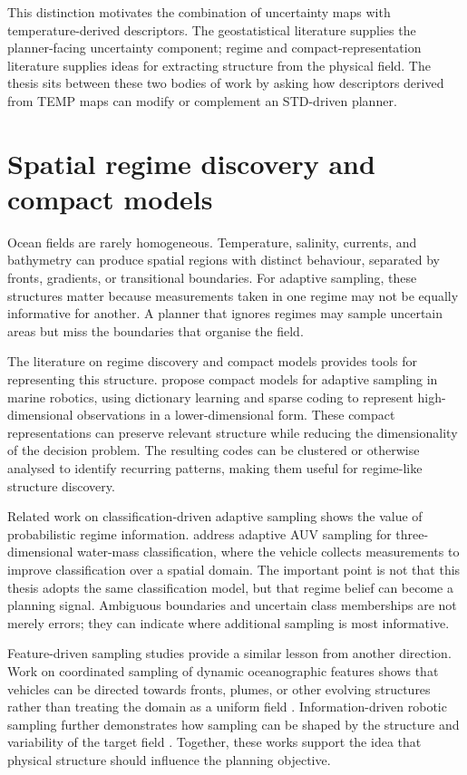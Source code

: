 This distinction motivates the combination of uncertainty maps with temperature-derived descriptors. The geostatistical literature supplies the planner-facing uncertainty component; regime and compact-representation literature supplies ideas for extracting structure from the physical field. The thesis sits between these two bodies of work by asking how descriptors derived from TEMP maps can modify or complement an STD-driven planner.

\section{Spatial regime discovery and compact models}
\label{sec:sota_regime_discovery}

Ocean fields are rarely homogeneous. Temperature, salinity, currents, and bathymetry can produce spatial regions with distinct behaviour, separated by fronts, gradients, or transitional boundaries. For adaptive sampling, these structures matter because measurements taken in one regime may not be equally informative for another. A planner that ignores regimes may sample uncertain areas but miss the boundaries that organise the field.

The literature on regime discovery and compact models provides tools for representing this structure. \textcite{fossum2020compact} propose compact models for adaptive sampling in marine robotics, using dictionary learning and sparse coding to represent high-dimensional observations in a lower-dimensional form. These compact representations can preserve relevant structure while reducing the dimensionality of the decision problem. The resulting codes can be clustered or otherwise analysed to identify recurring patterns, making them useful for regime-like structure discovery.

Related work on classification-driven adaptive sampling shows the value of probabilistic regime information. \textcite{ge2023watermasses} address adaptive AUV sampling for three-dimensional water-mass classification, where the vehicle collects measurements to improve classification over a spatial domain. The important point is not that this thesis adopts the same classification model, but that regime belief can become a planning signal. Ambiguous boundaries and uncertain class memberships are not merely errors; they can indicate where additional sampling is most informative.

Feature-driven sampling studies provide a similar lesson from another direction. Work on coordinated sampling of dynamic oceanographic features shows that vehicles can be directed towards fronts, plumes, or other evolving structures rather than treating the domain as a uniform field \parencite{das2012coordinated}. Information-driven robotic sampling further demonstrates how sampling can be shaped by the structure and variability of the target field \parencite{fossum2018informationdriven,fossum2019phytoplankton}. Together, these works support the idea that physical structure should influence the planning objective.

